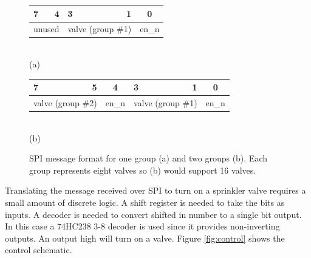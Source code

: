 \documentclass{article}
\begin{document}
{
\renewcommand*\arraystretch{1.5}
\begin{figure}[hbp]

\centering

\begin{tabular}{l r l r l r }
7 & 4 & 3 & 1 & \multicolumn{2}{c}{0} \\
\hline
\multicolumn{2}{|c|}{\hspace*{6mm} unused \hspace*{6mm}} &
\multicolumn{2}{|c|}{\hspace*{4mm} valve (group \#1) \hspace*{4mm}} &
\multicolumn{2}{|c|}{\hspace*{1mm} en\_n \hspace*{1mm}} \\
\hline
\end{tabular} \\
(a)

\begin{tabular}{l r l r l r l r }
7 & 5 & \multicolumn{2}{c}{4} & 3 & 1 & \multicolumn{2}{c}{0} \\
\hline
\multicolumn{2}{|c|}{\hspace*{4mm} valve (group \#2) \hspace*{4mm}} &
\multicolumn{2}{|c|}{\hspace*{1mm} en\_n \hspace*{1mm}} &
\multicolumn{2}{|c|}{\hspace*{4mm} valve (group \#1) \hspace*{4mm}} &
\multicolumn{2}{|c|}{\hspace*{1mm} en\_n \hspace*{1mm}} \\
\hline
\end{tabular} \\
(b)

\caption{SPI message format for one group (a) and two groups (b).
Each group represents eight valves so (b) would support 16 valves.}
\label{fig:spi}
\end{figure}
}

Translating the message received over SPI to turn on
a sprinkler valve requires a small amount of discrete logic.
A shift register is needed to take the bits as inputs.
A decoder is needed to convert shifted in number to a single
bit output.
In this case a 74HC238 3-8 decoder is used since it provides non-inverting
outputs.
An output high will turn on a valve.
Figure \ref{fig:control} shows the control schematic.
\end{document}
